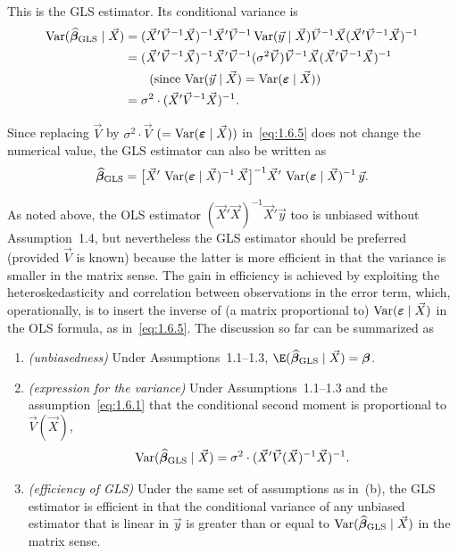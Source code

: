 This is the GLS estimator.  Its conditional variance is
%
\begin{align}
  \operatorname{Var}(\widehat{\bm{\beta}}_{\text{GLS}} \mid \vec{X})
    &= (\vec{X}'\vec{V}^{-1}\vec{X})^{-1}\vec{X}'\vec{V}^{-1}
       \operatorname{Var}(\vec{y} \mid \vec{X})\vec{V}^{-1}\vec{X}
       (\vec{X}'\vec{V}^{-1}\vec{X})^{-1} \notag \\
    &= (\vec{X}'\vec{V}^{-1}\vec{X})^{-1}\vec{X}'\vec{V}^{-1}
       (\sigma^2 \vec{V})\vec{V}^{-1}\vec{X}
       (\vec{X}'\vec{V}^{-1}\vec{X})^{-1} \notag \\
    &\qquad \text{(since $\operatorname{Var}(\vec{y} \mid \vec{X}) = \operatorname{Var}(\bm{\varepsilon}
      \mid \vec{X})$)} \notag \\
    &= \sigma^2 \cdot (\vec{X}'\vec{V}^{-1}\vec{X})^{-1}.
  \label{eq:1.6.6}
\end{align}

Since replacing $\vec{V}$ by $\sigma^2 \cdot \vec{V}$ $(= \operatorname{Var}(\bm{\varepsilon}
\mid \vec{X}))$ in~\eqref{eq:1.6.5} does not change the numerical value, the GLS
estimator can also be written as
%
\[
  \widehat{\bm{\beta}}_{\text{GLS}}
    = \bigl[\vec{X}'\,\operatorname{Var}(\bm{\varepsilon} \mid \vec{X})^{-1}\,\vec{X}\bigr]^{-1}
      \vec{X}'\,\operatorname{Var}(\bm{\varepsilon} \mid \vec{X})^{-1}\,\vec{y}.
\]

As noted above, the OLS estimator $(\vec{X}'\vec{X})^{-1}\vec{X}'\vec{y}$ too is
unbiased without Assumption~1.4, but nevertheless the GLS estimator should be preferred
(provided $\vec{V}$ is known) because the latter is more efficient in that the variance
is smaller in the matrix sense.  The gain in efficiency is achieved by exploiting the
heteroskedasticity and correlation between observations in the error term, which,
operationally, is to insert the inverse of (a matrix proportional to)
$\operatorname{Var}(\bm{\varepsilon} \mid \vec{X})$ in the OLS formula, as in~\eqref{eq:1.6.5}.
The discussion so far can be summarized as

\begin{proposition}
\label{prop:1.7}
\mbox{}
\begin{enumerate}[label=(\alph*)]
  \item \emph{(unbiasedness)}\enspace
    Under Assumptions~1.1--1.3,
    $\E(\widehat{\bm{\beta}}_{\textup{GLS}} \mid \vec{X}) = \bm{\beta}$.

  \item \emph{(expression for the variance)}\enspace
    Under Assumptions~1.1--1.3 and the assumption~\eqref{eq:1.6.1} that the
    conditional second moment is proportional to $\vec{V}(\vec{X})$,
    \[
      \operatorname{Var}(\widehat{\bm{\beta}}_{\textup{GLS}} \mid \vec{X})
        = \sigma^2 \cdot (\vec{X}'\vec{V}(\vec{X})^{-1}\vec{X})^{-1}.
    \]

  \item \emph{(efficiency of GLS)}\enspace
    Under the same set of assumptions as in~(b), the GLS estimator is efficient
    in that the conditional variance of any unbiased estimator that is linear in
    $\vec{y}$ is greater than or equal to
    $\operatorname{Var}(\widehat{\bm{\beta}}_{\textup{GLS}} \mid \vec{X})$ in the matrix sense.
\end{enumerate}
\end{proposition}

